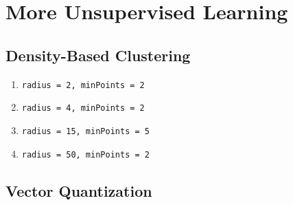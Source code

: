 \documentclass{article}
\def\enum#1{\begin{enumerate}#1\end{enumerate}}
\begin{document}
\section{More Unsupervised Learning}

\subsection{Density-Based Clustering}
\enum{
\item \texttt{radius = 2, minPoints = 2}
\item \texttt{radius = 4, minPoints = 2}
\item \texttt{radius = 15, minPoints = 5}
\item \texttt{radius = 50, minPoints = 2}
}

\subsection{Vector Quantization}
\end{document}
